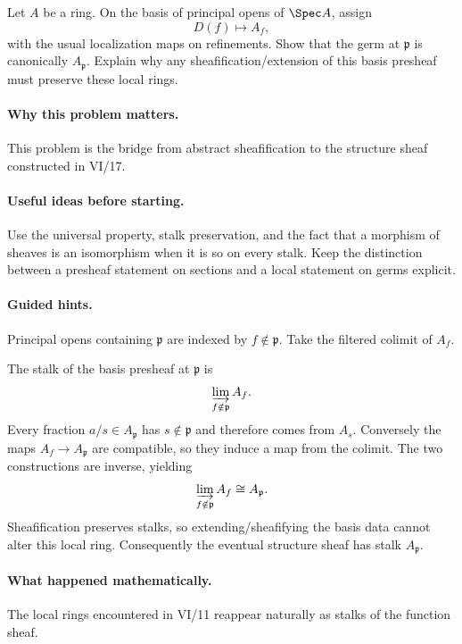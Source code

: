 \begin{problem}
Let $A$ be a ring. On the basis of principal opens of $\Spec A$, assign
\[
D(f)\longmapsto A_f,
\]
with the usual localization maps on refinements. Show that the germ at $\mathfrak p$ is canonically $A_{\mathfrak p}$. Explain why any sheafification/extension of this basis presheaf must preserve these local rings.
\end{problem}

\paragraph{Why this problem matters.}
This problem is the bridge from abstract sheafification to the structure sheaf constructed in VI/17.

\paragraph{Useful ideas before starting.}
Use the universal property, stalk preservation, and the fact that a morphism of sheaves is an isomorphism when it is so on every stalk.  Keep the distinction between a presheaf statement on sections and a local statement on germs explicit.

\paragraph{Guided hints.}
Principal opens containing $\mathfrak p$ are indexed by $f\notin\mathfrak p$. Take the filtered colimit of $A_f$.

\ifdefined\FullProblemDossiers
\begin{solution}
The stalk of the basis presheaf at $\mathfrak p$ is
\[
\varinjlim_{f\notin\mathfrak p}A_f.
\]
Every fraction $a/s\in A_{\mathfrak p}$ has $s\notin\mathfrak p$ and therefore comes from $A_s$. Conversely the maps $A_f\to A_{\mathfrak p}$ are compatible, so they induce a map from the colimit. The two constructions are inverse, yielding
\[
\varinjlim_{f\notin\mathfrak p}A_f\cong A_{\mathfrak p}.
\]
Sheafification preserves stalks, so extending/sheafifying the basis data cannot alter this local ring. Consequently the eventual structure sheaf has stalk $A_{\mathfrak p}$.
\end{solution}

\paragraph{What happened mathematically.}
The local rings encountered in VI/11 reappear naturally as stalks of the function sheaf.

